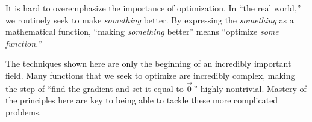 It is hard to overemphasize the importance of optimization. In ``the real world,'' we routinely seek to make \textit{something} better. By expressing the \textit{something} as a mathematical function, ``making \textit{something} better'' means ``optimize \textit{some function.}'' 

The techniques shown here are only the beginning of an incredibly important field. Many functions that we seek to optimize are incredibly complex, making the step of ``find the gradient and set it equal to $\vec 0$\,'' highly nontrivial. Mastery of the principles here are key to being able to tackle these more complicated problems.

